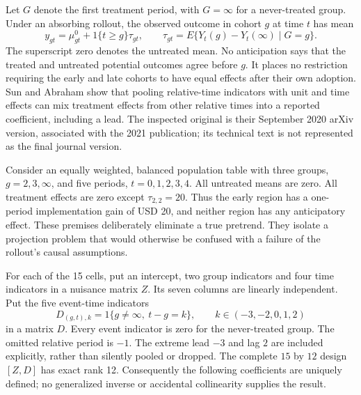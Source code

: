 Let $G$ denote the first treatment period, with $G=\infty$ for a never-treated
group. Under an absorbing rollout, the observed outcome in cohort $g$ at time
$t$ has mean
\begin{equation}
 y_{gt}=\mu_{gt}^{0}+1\{t\geq g\}\tau_{gt},
 \qquad \tau_{gt}=E\{Y_t(g)-Y_t(\infty)\mid G=g\}.
 \label{exec17:s6-cohort-law}
\end{equation}
The superscript zero denotes the untreated mean. No anticipation says that
the treated and untreated potential outcomes agree before $g$. It places no
restriction requiring the early and late cohorts to have equal effects after
their own adoption. Sun and Abraham show that pooling relative-time
indicators with unit and time effects can mix treatment effects from other
relative times into a reported coefficient, including a lead. The inspected
original is their September 2020 arXiv version, associated with the 2021
publication; its technical text is not represented as the final journal
version.~\citep{sun2021}

Consider an equally weighted, balanced population table with three groups,
$g=2,3,\infty$, and five periods, $t=0,1,2,3,4$. All untreated means are zero.
All treatment effects are zero except $\tau_{2,2}=20$. Thus the early region
has a one-period implementation gain of USD 20, and neither region has any
anticipatory effect. These premises deliberately eliminate a true pretrend.
They isolate a projection problem that would otherwise be confused with a
failure of the rollout's causal assumptions.

For each of the 15 cells, put an intercept, two group indicators and four
time indicators in a nuisance matrix $Z$. Its seven columns are linearly
independent. Put the five event-time indicators
\begin{equation}
 D_{(g,t),k}=1\{g\ne\infty,\ t-g=k\},
 \qquad k\in(-3,-2,0,1,2)
 \label{exec17:s6-design}
\end{equation}
in a matrix $D$. Every event indicator is zero for the never-treated group.
The omitted relative period is $-1$. The extreme lead $-3$ and lag $2$
are included explicitly, rather than silently pooled or dropped. The complete
$15$ by $12$ design $[Z,D]$ has exact rank 12. Consequently the following
coefficients are uniquely defined; no generalized inverse or accidental
collinearity supplies the result.

